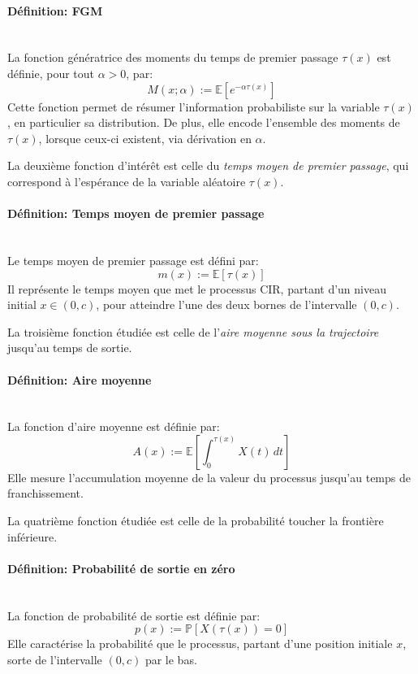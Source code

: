 \paragraph{Définition: \ac{FGM}}\mbox{}\\
La fonction génératrice des moments du temps de premier passage $\tau(x)$ est définie, pour tout $\alpha > 0$, par:
\begin{equation}\label{fgm}
    M(x;\alpha):= \mathds{E} \left[ e^{-\alpha \tau(x)} \right]
\end{equation}
Cette fonction permet de résumer l'information probabiliste sur la variable $\tau(x)$, en particulier sa distribution. De plus, elle encode l'ensemble des moments de $\tau(x)$, lorsque ceux-ci existent, via dérivation en $\alpha$. 

La deuxième fonction d'intérêt est celle du \textit{temps moyen de premier passage}, qui correspond à l'espérance de la variable aléatoire $\tau(x)$.
\paragraph{Définition: Temps moyen de premier passage}\mbox{}\\
Le temps moyen de premier passage est défini par:
\begin{equation}\label{mean}
    m(x):= \mathds{E}[\tau(x)]
\end{equation}
Il représente le temps moyen que met le processus \acs{CIR}, partant d'un niveau initial $x \in (0,c)$, pour atteindre l'une des deux bornes de l'intervalle $(0,c)$.

La troisième fonction étudiée est celle de l'\textit{aire moyenne sous la trajectoire} jusqu'au temps de sortie.
\paragraph{Définition: Aire moyenne}\mbox{}\\
La fonction d'aire moyenne est définie par:
\begin{equation}\label{area}
    A(x):= \mathds{E} \left[ \int_0^{\tau(x)} X(t)\,dt \right]
\end{equation}
Elle mesure l'accumulation moyenne de la valeur du processus jusqu'au temps de franchissement.

La quatrième fonction étudiée est celle de la probabilité toucher la frontière inférieure.
\paragraph{Définition: Probabilité de sortie en zéro}\mbox{}\\
La fonction de probabilité de sortie est définie par:
\begin{equation}\label{zero_exit_probability}
    p(x):=\mathds{P}[X(\tau(x))=0]
\end{equation}
Elle caractérise la probabilité que le processus, partant d'une position initiale $x$, sorte de l'intervalle $(0,c)$ par le bas.

